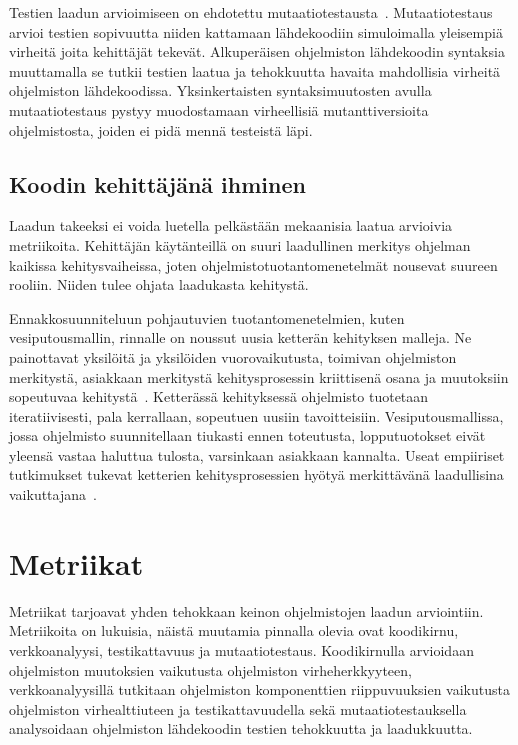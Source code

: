 \documentclass[finnish]{../tktltiki2}
\theoremstyle{definition}
\theoremstyle{remark}
\begin{document}
    Testien laadun arvioimiseen on ehdotettu mutaatiotestausta~\cite{YH11}. Mutaatiotestaus arvioi testien sopivuutta 
niiden kattamaan lähdekoodiin simuloimalla yleisempiä virheitä joita kehittäjät tekevät. Alkuperäisen ohjelmiston 
lähdekoodin syntaksia muuttamalla se tutkii testien laatua ja tehokkuutta havaita mahdollisia virheitä ohjelmiston 
lähdekoodissa. Yksinkertaisten syntaksimuutosten avulla mutaatiotestaus pystyy muodostamaan virheellisiä 
mutanttiversioita ohjelmistosta, joiden ei pidä mennä testeistä läpi.

\subsection{Koodin kehittäjänä ihminen}

Laadun takeeksi ei voida luetella pelkästään mekaanisia laatua arvioivia metriikoita. Kehittäjän käytänteillä on suuri 
laadullinen merkitys ohjelman kaikissa kehitysvaiheissa, joten ohjelmistotuotantomenetelmät nousevat suureen rooliin. 
Niiden tulee ohjata laadukasta kehitystä.

    Ennakkosuunniteluun pohjautuvien tuotantomenetelmien, kuten vesiputousmallin, rinnalle on noussut uusia ketterän 
kehityksen malleja. Ne painottavat yksilöitä ja yksilöiden vuorovaikutusta, toimivan ohjelmiston merkitystä, asiakkaan 
merkitystä kehitysprosessin kriittisenä osana ja muutoksiin sopeutuvaa kehitystä~\cite{BBB01}. Ketterässä kehityksessä 
ohjelmisto tuotetaan iteratiivisesti, pala kerrallaan, sopeutuen uusiin tavoitteisiin. Vesiputousmallissa, jossa 
ohjelmisto suunnitellaan tiukasti ennen toteutusta, lopputuotokset eivät yleensä vastaa haluttua tulosta, varsinkaan 
asiakkaan kannalta. Useat empiiriset tutkimukset tukevat ketterien kehitysprosessien hyötyä merkittävänä laadullisina 
vaikuttajana~\cite{SS10}.

\section{Metriikat}

Metriikat tarjoavat yhden tehokkaan keinon ohjelmistojen laadun arviointiin. Metriikoita on lukuisia, näistä muutamia 
pinnalla olevia ovat koodikirnu, verkkoanalyysi, testikattavuus ja mutaatiotestaus. Koodikirnulla arvioidaan ohjelmiston 
muutoksien vaikutusta ohjelmiston virheherkkyyteen, verkkoanalyysillä tutkitaan ohjelmiston komponenttien riippuvuuksien 
vaikutusta ohjelmiston virhealttiuteen ja testikattavuudella sekä mutaatiotestauksella analysoidaan ohjelmiston 
lähdekoodin testien tehokkuutta ja laadukkuutta.
\end{document}
